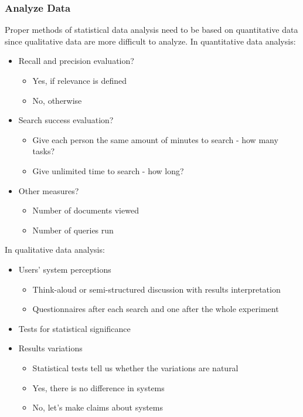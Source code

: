 \documentclass{article}
\begin{document}
\subsubsection{Analyze Data}
Proper methods of statistical data analysis need to be based on quantitative data since qualitative data are more difficult to analyze. In quantitative data analysis:
\begin{itemize}
    \item Recall and precision evaluation?
        \begin{itemize}
            \item Yes, if relevance is defined
            \item No, otherwise
        \end{itemize}
    \item Search success evaluation?
        \begin{itemize}
            \item Give each person the same amount of minutes to search - how many tasks?
            \item Give unlimited time to search - how long?
        \end{itemize}
    \item Other measures?
        \begin{itemize}
            \item Number of documents viewed
            \item Number of queries run
        \end{itemize}
\end{itemize}
In qualitative data analysis:
\begin{itemize}
    \item Users' system perceptions
        \begin{itemize}
            \item Think-aloud or semi-structured discussion with results interpretation
            \item Questionnaires after each search and one after the whole experiment
        \end{itemize}
    \item Tests for statistical significance
    \item Results variations
        \begin{itemize}
            \item Statistical tests tell us whether the variations are natural
            \item Yes, there is no difference in systems
            \item No, let's make claims about systems
        \end{itemize}
\end{itemize}
\end{document}
